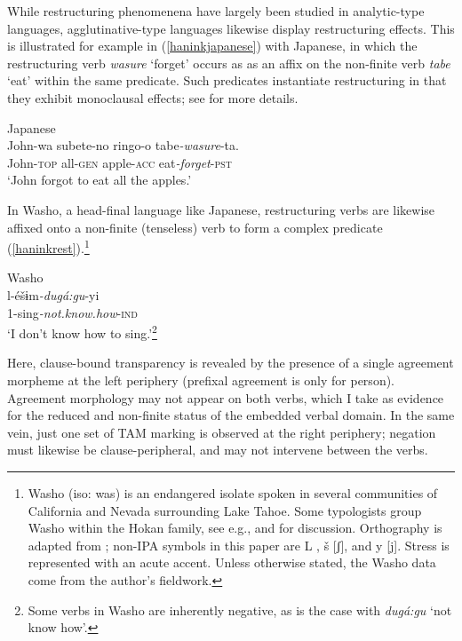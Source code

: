 \documentclass[output=paper]{langscibook}
\begin{document}
 While restructuring phenomenena have largely been studied in analytic-type languages, agglutinative-type languages likewise display restructuring effects. This is  illustrated for example in (\ref{haninkjapanese}) with Japanese, in which the restructuring verb {\itshape wasure} `forget' occurs as as an affix on the non-finite verb {\itshape tabe} `eat' within the same predicate. Such predicates instantiate restructuring in that they exhibit monoclausal effects; see \citealt{shimamurawurmbrand2014} for more details.



\ea Japanese\\
\gll 
 John-wa subete-no ringo-o tabe\textit{-wasure}-ta.\\
John-{\scshape top} all-{\scshape gen} apple-{\scshape acc} eat\textit{-forget}-{\scshape pst}\\
\glt `John forgot to eat all the apples.' \hfill \citep[2]{shimamurawurmbrand2014} \label{haninkjapanese}
\z

 
 In Washo, a head-final language like Japanese, restructuring verbs are likewise affixed onto a non-finite (tenseless) verb to form a complex predicate (\ref{haninkrest}).\footnote{Washo (iso: was) is an endangered isolate spoken in several communities of California and Nevada surrounding Lake Tahoe. Some typologists group Washo within the Hokan family, see e.g., \citet{campbell1997} and \citet{mithun1999} for discussion. Orthography is adapted from \citet{jacobsen1964}; non-IPA symbols in this paper are L \textipa{[\r*l]}, š [ʃ], and y [j]. Stress is represented with an acute accent. Unless otherwise stated, the Washo data come from the author's fieldwork.} 
 
 \ea\label{haninkrest} Washo\\
 \gll l-éšɨm\textit{-dugá:gu}-yi\\
1-sing\textit{-not.know.how}-\textsc{ind}\\ 
\glt `I don't know how to sing.'\footnote{Some verbs in Washo are inherently negative, as is the case with {\itshape dugá:gu} `not know how'.} 
\z 
 
\noindent Here, clause-bound transparency is revealed by the presence of a single agreement morpheme at the left periphery (prefixal agreement is only for person). Agreement morphology may not appear on both verbs, which I take as evidence for the reduced and non-finite status of the embedded verbal domain. In the same vein, just one set of TAM marking is observed at the right periphery;  negation must likewise be clause-peripheral, and may not intervene between the verbs.
\end{document}
